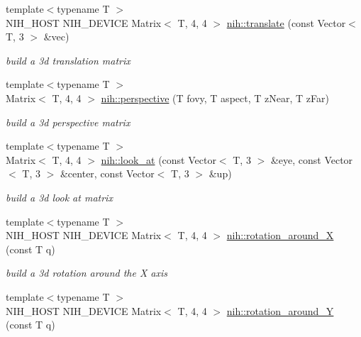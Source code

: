 \begin{DoxyCompactItemize}
\item 
\hypertarget{group__linalg_ga5d92f3307949b63085b54c2c4d14cb78}{
{\footnotesize template$<$typename T $>$ }\\\-N\-I\-H\-\_\-\-H\-O\-S\-T \-N\-I\-H\-\_\-\-D\-E\-V\-I\-C\-E \-Matrix$<$ \-T, 4, 4 $>$ \hyperlink{group__linalg_ga5d92f3307949b63085b54c2c4d14cb78}{nih\-::translate} (const \-Vector$<$ \-T, 3 $>$ \&vec)}
\label{group__linalg_ga5d92f3307949b63085b54c2c4d14cb78}

\begin{DoxyCompactList}\small\item\em build a 3d translation matrix \end{DoxyCompactList}\item 
\hypertarget{group__linalg_gad1ee54c47ad750f6485c00f707dd978c}{
{\footnotesize template$<$typename T $>$ }\\\-Matrix$<$ \-T, 4, 4 $>$ \hyperlink{group__linalg_gad1ee54c47ad750f6485c00f707dd978c}{nih\-::perspective} (\-T fovy, \-T aspect, \-T z\-Near, \-T z\-Far)}
\label{group__linalg_gad1ee54c47ad750f6485c00f707dd978c}

\begin{DoxyCompactList}\small\item\em build a 3d perspective matrix \end{DoxyCompactList}\item 
\hypertarget{group__linalg_ga9df91e2ecf368ee7e7b9dddce3a7f3d1}{
{\footnotesize template$<$typename T $>$ }\\\-Matrix$<$ \-T, 4, 4 $>$ \hyperlink{group__linalg_ga9df91e2ecf368ee7e7b9dddce3a7f3d1}{nih\-::look\-\_\-at} (const \-Vector$<$ \-T, 3 $>$ \&eye, const \-Vector$<$ \-T, 3 $>$ \&center, const \-Vector$<$ \-T, 3 $>$ \&up)}
\label{group__linalg_ga9df91e2ecf368ee7e7b9dddce3a7f3d1}

\begin{DoxyCompactList}\small\item\em build a 3d look at matrix \end{DoxyCompactList}\item 
\hypertarget{group__linalg_gaf42e47e61afca06aff0efdbb26cfc1ef}{
{\footnotesize template$<$typename T $>$ }\\\-N\-I\-H\-\_\-\-H\-O\-S\-T \-N\-I\-H\-\_\-\-D\-E\-V\-I\-C\-E \-Matrix$<$ \-T, 4, 4 $>$ \hyperlink{group__linalg_gaf42e47e61afca06aff0efdbb26cfc1ef}{nih\-::rotation\-\_\-around\-\_\-\-X} (const \-T q)}
\label{group__linalg_gaf42e47e61afca06aff0efdbb26cfc1ef}

\begin{DoxyCompactList}\small\item\em build a 3d rotation around the \-X axis \end{DoxyCompactList}\item 
\hypertarget{group__linalg_ga21af57144d9398e235230c2096f64655}{
{\footnotesize template$<$typename T $>$ }\\\-N\-I\-H\-\_\-\-H\-O\-S\-T \-N\-I\-H\-\_\-\-D\-E\-V\-I\-C\-E \-Matrix$<$ \-T, 4, 4 $>$ \hyperlink{group__linalg_ga21af57144d9398e235230c2096f64655}{nih\-::rotation\-\_\-around\-\_\-\-Y} (const \-T q)}
\label{group__linalg_ga21af57144d9398e235230c2096f64655}


\end{DoxyCompactItemize}
